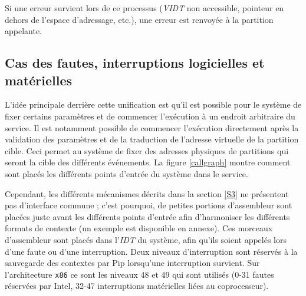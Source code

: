 Si une erreur survient lors de ce processus (\emph{VIDT} non accessible, pointeur en dehors de l'espace d'adressage, etc.), une erreur est renvoyée à la partition appelante.

\subsection{Cas des fautes, interruptions logicielles et matérielles}

L'idée principale derrière cette unification est qu'il est possible pour le système de fixer certains paramètres et de commencer l'exécution à un endroit arbitraire du service. Il est notamment possible de commencer l'exécution directement après la validation des paramètres et de la traduction de l'adresse virtuelle de la partition cible. Ceci permet au système de fixer des adresses physiques de partitions qui seront la cible des différents événements. La figure \ref{callgraph} montre comment sont placés les différents points d'entrée du système dans le service.

Cependant, les différents mécanismes décrits dans la section \ref{S3} ne présentent pas d'interface commune ; c'est pourquoi, de petites portions d'assembleur sont placées juste avant les différents points d'entrée afin d'harmoniser les différents formats de contexte (un exemple est disponible en annexe). Ces morceaux d'assembleur sont placés dans l'\emph{IDT} du système, afin qu'ils soient appelés lors d'une faute ou d'une interruption. Deux niveaux d'interruption sont réservés à la sauvegarde des contextes par Pip lorsqu'une interruption survient. Sur l'architecture \texttt{x86} ce sont les niveaux 48 et 49 qui sont utilisés (0-31 fautes réservées par Intel, 32-47 interruptions matérielles liées au coprocesseur).



